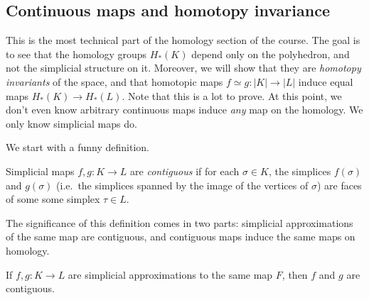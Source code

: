 \documentclass[a4paper]{article}
\begin{document}
\subsection{Continuous maps and homotopy invariance}
This is the most technical part of the homology section of the course. The goal is to see that the homology groups $H_*(K)$ depend only on the polyhedron, and not the simplicial structure on it. Moreover, we will show that they are \emph{homotopy invariants} of the space, and that homotopic maps $f \simeq g: |K| \to |L|$ induce equal maps $H_*(K) \to H_*(L)$. Note that this is a lot to prove. At this point, we don't even know arbitrary continuous maps induce \emph{any} map on the homology. We only know simplicial maps do.

We start with a funny definition.
\begin{defi}
  Simplicial maps $f, g: K \to L$ are \emph{contiguous} if for each $\sigma \in K$, the simplices $f(\sigma)$ and $g(\sigma)$ (i.e.\ the simplices spanned by the image of the vertices of $\sigma$) are faces of some some simplex $\tau \in L$.
  \begin{center}
  \end{center}
\end{defi}

The significance of this definition comes in two parts: simplicial approximations of the same map are contiguous, and contiguous maps induce the same maps on homology.

\begin{lemma}
  If $f, g: K \to L$ are simplicial approximations to the same map $F$, then $f$ and $g$ are contiguous.
\end{lemma}
\end{document}
